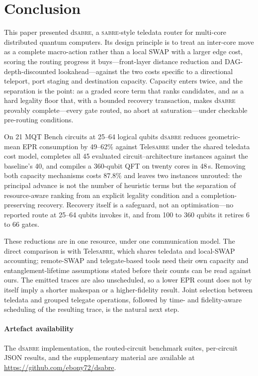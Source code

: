 \documentclass[journal]{IEEEtran}
\newcommand{\dSABRE}{d\textsc{sabre}}
\newcommand{\TeleSABRE}{Tele\textsc{sabre}}
\newcommand{\SABRE}{\textsc{sabre}}
\begin{document}
\section{Conclusion}
\label{sec:conclusion}

This paper presented \dSABRE{}, a \SABRE{}-style teledata router for
multi-core distributed quantum computers. Its design principle is to treat an
inter-core move as a complete macro-action rather than a local SWAP with a
larger edge cost, scoring the routing progress it buys---front-layer distance
reduction and DAG-depth-discounted lookahead---against the two costs specific
to a directional teleport, port staging and destination capacity. Capacity
enters twice, and the separation is the point: as a graded score term that
ranks candidates, and as a hard legality floor that, with a bounded recovery
transaction, makes \dSABRE{} provably complete---every gate routed, no abort at
saturation---under checkable pre-routing conditions.

On 21 MQT Bench circuits at 25--64 logical qubits \dSABRE{} reduces
geometric-mean EPR consumption by 49--62\% against \TeleSABRE{} under the
shared teledata cost model, completes all 45 evaluated circuit--architecture
instances against the baseline's 40, and compiles a 360-qubit QFT on twenty
cores in 48\,s. Removing both capacity mechanisms costs $87.8\%$ and leaves two
instances unrouted: the principal advance is not the number of heuristic terms
but the separation of resource-aware ranking from an explicit legality
condition and a completion-preserving recovery. Recovery itself is a
safeguard, not an optimisation---no reported route at 25--64 qubits invokes it,
and from 100 to 360 qubits it retires 6 to 66 gates.

These reductions are in one resource, under one communication model. The
direct comparison is with \TeleSABRE{}, which shares teledata and local-SWAP
accounting; remote-SWAP and telegate-based tools need their own capacity and
entanglement-lifetime assumptions stated before their counts can be read
against ours. The emitted traces are also unscheduled, so a lower EPR count does
not by itself imply a shorter makespan or a higher-fidelity result. Joint
selection between teledata and grouped telegate operations, followed by time-
and fidelity-aware scheduling of the resulting trace, is the natural next
step.


\paragraph*{Artefact availability}
The \dSABRE{} implementation, the routed-circuit benchmark suites,
per-circuit JSON results, and the supplementary material are
available at
\url{https://github.com/ebony72/dsabre}.
\end{document}
